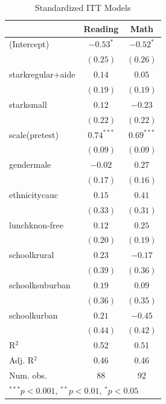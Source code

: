 \documentclass[doc]{apa6}\usepackage[]{graphicx}\usepackage[]{color}
\begin{document}
\begin{table}[h]
\begin{center}
\begin{tabular}{l c c }
\hline
                  & Reading & Math \\
\hline
(Intercept)       & $-0.53^{*}$  & $-0.52^{*}$  \\
                  & $(0.25)$     & $(0.26)$     \\
starkregular+aide & $0.14$       & $0.05$       \\
                  & $(0.19)$     & $(0.19)$     \\
starksmall        & $0.12$       & $-0.23$      \\
                  & $(0.22)$     & $(0.22)$     \\
scale(pretest)    & $0.74^{***}$ & $0.69^{***}$ \\
                  & $(0.09)$     & $(0.09)$     \\
gendermale        & $-0.02$      & $0.27$       \\
                  & $(0.17)$     & $(0.16)$     \\
ethnicitycauc     & $0.15$       & $0.41$       \\
                  & $(0.33)$     & $(0.31)$     \\
lunchknon-free    & $0.12$       & $0.25$       \\
                  & $(0.20)$     & $(0.19)$     \\
schoolkrural      & $0.23$       & $-0.17$      \\
                  & $(0.39)$     & $(0.36)$     \\
schoolksuburban   & $0.19$       & $0.09$       \\
                  & $(0.36)$     & $(0.35)$     \\
schoolkurban      & $0.21$       & $-0.45$      \\
                  & $(0.44)$     & $(0.42)$     \\
\hline
R$^2$             & 0.52         & 0.51         \\
Adj. R$^2$        & 0.46         & 0.46         \\
Num. obs.         & 88           & 92           \\
\hline
\multicolumn{3}{l}{\scriptsize{$^{***}p<0.001$, $^{**}p<0.01$, $^*p<0.05$}}
\end{tabular}
\caption{Standardized ITT Models}
\label{table:coefficients}
\end{center}
\end{table}
\end{document}

